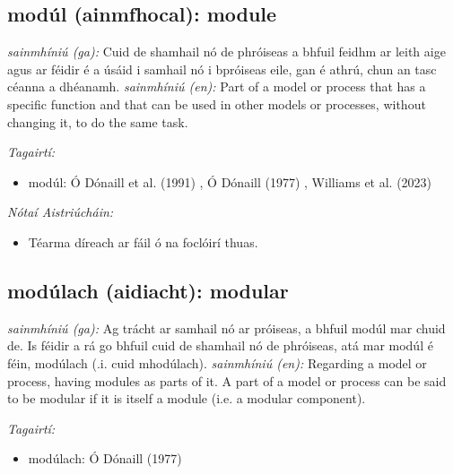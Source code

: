 \documentclass{article}
\begin{document}
\subsection*{modúl (ainmfhocal): module} 
 \noindent \textit{sainmhíniú (ga):} Cuid de shamhail nó de phróiseas a bhfuil feidhm ar leith aige agus ar féidir é a úsáid i samhail nó i bpróiseas eile, gan é athrú, chun an tasc céanna a dhéanamh.
\newline\newline
 \noindent \textit{sainmhíniú (en):} Part of a model or process that has a specific function and that can be used in other models or processes, without changing it, to do the same task.
\newline

 \noindent \textit{Tagairtí:}
\begin{itemize}
	\item modúl: Ó Dónaill et al. (1991) \cite{focloir-beag}, Ó Dónaill (1977) \cite{odonaill}, Williams et al. (2023) \cite{storchiste}
\end{itemize}

 \noindent \textit{Nótaí Aistriúcháin:}
\begin{itemize}
	\item Téarma díreach ar fáil ó na foclóirí thuas.
\end{itemize}


\subsection*{modúlach (aidiacht): modular} 
 \noindent \textit{sainmhíniú (ga):} Ag trácht ar samhail nó ar próiseas, a bhfuil modúl mar chuid de. Is féidir a rá go bhfuil cuid de shamhail nó de phróiseas, atá mar modúl é féin, modúlach (.i. cuid mhodúlach).
\newline\newline
 \noindent \textit{sainmhíniú (en):} Regarding a model or process, having modules as parts of it. A part of a model or process can be said to be modular if it is itself a module (i.e. a modular component).
\newline

 \noindent \textit{Tagairtí:}
\begin{itemize}
	\item modúlach: Ó Dónaill (1977) \cite{odonaill}
\end{itemize}
\end{document}
